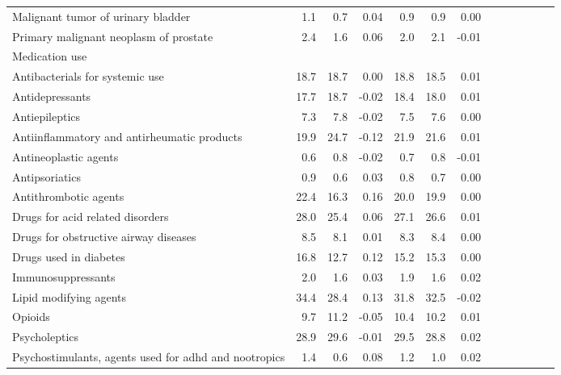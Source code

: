 \documentclass[11pt,]{article}
\begin{document}
\begin{longtable}{lrrrrrrrrrrrr}
      Malignant tumor of urinary bladder &  1.1 &  0.7 &  0.04 &  0.9 &  0.9 &  0.00 \\ 
      Primary malignant neoplasm of prostate &  2.4 &  1.6 &  0.06 &  2.0 &  2.1 & -0.01 \\ 
  Medication use &    &    &     &    &    &     \\ 
      Antibacterials for systemic use & 18.7 & 18.7 &  0.00 & 18.8 & 18.5 &  0.01 \\ 
      Antidepressants & 17.7 & 18.7 & -0.02 & 18.4 & 18.0 &  0.01 \\ 
      Antiepileptics &  7.3 &  7.8 & -0.02 &  7.5 &  7.6 &  0.00 \\ 
      Antiinflammatory and antirheumatic products & 19.9 & 24.7 & -0.12 & 21.9 & 21.6 &  0.01 \\ 
      Antineoplastic agents &  0.6 &  0.8 & -0.02 &  0.7 &  0.8 & -0.01 \\ 
      Antipsoriatics &  0.9 &  0.6 &  0.03 &  0.8 &  0.7 &  0.00 \\ 
      Antithrombotic agents & 22.4 & 16.3 &  0.16 & 20.0 & 19.9 &  0.00 \\ 
      Drugs for acid related disorders & 28.0 & 25.4 &  0.06 & 27.1 & 26.6 &  0.01 \\ 
      Drugs for obstructive airway diseases &  8.5 &  8.1 &  0.01 &  8.3 &  8.4 &  0.00 \\ 
      Drugs used in diabetes & 16.8 & 12.7 &  0.12 & 15.2 & 15.3 &  0.00 \\ 
      Immunosuppressants &  2.0 &  1.6 &  0.03 &  1.9 &  1.6 &  0.02 \\ 
      Lipid modifying agents & 34.4 & 28.4 &  0.13 & 31.8 & 32.5 & -0.02 \\ 
      Opioids &  9.7 & 11.2 & -0.05 & 10.4 & 10.2 &  0.01 \\ 
      Psycholeptics & 28.9 & 29.6 & -0.01 & 29.5 & 28.8 &  0.02 \\ 
      Psychostimulants, agents used for adhd and nootropics &  1.4 &  0.6 &  0.08 &  1.2 &  1.0 &  0.02 \\ 
   \bottomrule\end{longtable}
\clearpage
{}
\end{document}
